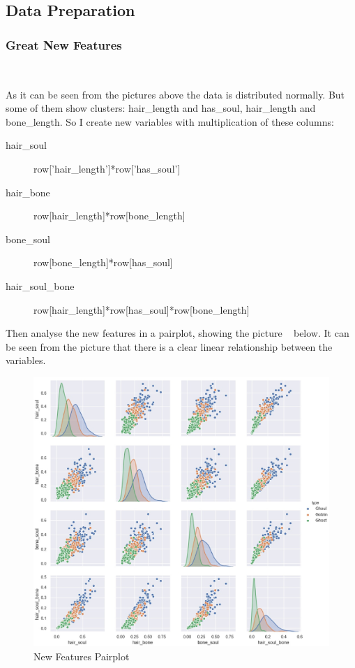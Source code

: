 \subsection{Data Preparation}

\subsubsection{Great New Features}
\

As it can be seen from 
the pictures above 
the data is distributed normally. 
But some of them show clusters: 
hair\_length and has\_soul, 
hair\_length and bone\_length. 
So I create new variables 
with multiplication of these columns: 

\begin{description}
	\item[hair\_soul] row[’hair\_length’]*row[’has_soul’] 
	\item[hair_bone]  row[hair_length]*row[bone_length] 
	\item[bone_soul]  row[bone_length]*row[has_soul] 
	\item[hair_soul_bone]  row[hair_length]*row[has_soul]*row[bone_length] 
\end{description}


Then analyse the new features in a pairplot, 
showing the picture ~
below. 
It can be seen from the picture that 
there is a clear linear relationship 
between the variables. 


\begin{figure}[htbp]
	\centering
	\includegraphics[scale=0.3]{figures/hist_1.eps}
	\caption{New Features Pairplot}\label{fig:new_pairplot}
\end{figure}


